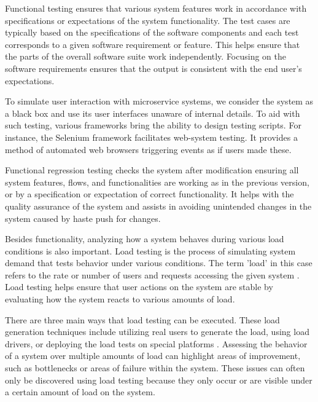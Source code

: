 Functional testing ensures that various system features work in accordance with specifications or expectations of the system functionality. The test cases are typically based on the specifications of the software components and each test corresponds to a given software requirement or feature. This helps ensure that the parts of the overall software suite work independently. Focusing on the software requirements ensures that the output is consistent with the end user's expectations.

To simulate user interaction with microservice systems, we consider the system as a black box and use its user interfaces unaware of internal details. To aid with such testing, various frameworks bring the ability to design testing scripts. For instance, the Selenium framework facilitates web-system testing. It provides a method of automated web browsers triggering events as if users made these. 

Functional regression testing checks the system after modification ensuring all system features, flows, and functionalities are working as in the previous version, or by a specification or expectation of correct functionality. It helps with the quality assurance of the system and assists in avoiding unintended changes in the system caused by haste push for changes.


Besides functionality, analyzing how a system behaves during various load conditions is also important. 
Load testing is the process of simulating system demand that tests behavior under various conditions. The term 'load' in this case refers to the rate or number of users and requests accessing the given system \cite{jiang2008automatic}. Load testing helps ensure that user actions on the system are stable by evaluating how the system reacts to various amounts of load. 

There are three main ways that load testing can be executed. These load generation techniques include utilizing real users to generate the load, using load drivers, or deploying the load tests on special platforms \cite{jiang2015survey}. Assessing the behavior of a system over multiple amounts of load can highlight areas of improvement, such as bottlenecks or areas of failure within the system. These issues can often only be discovered using load testing because they only occur or are visible under a certain amount of load on the system. 

